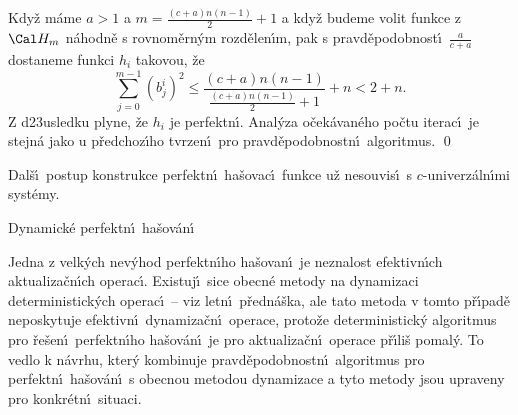 \documentclass[a4paper,12pt]{article}
\begin{document}
\flushpar Kdy\v z m\'ame $a>1$ a $m=\frac {(c+a)n(n-1)}2+1$ 
a kdy\v z budeme volit funkce z $\Cal H_m$ 
n\'ahodn\v e s rovnom\v ern\'ym rozd\v elen\'\i m, pak s pravd\v epodobnost\'\i\ 
$\frac a{c+a}$ do\-sta\-ne\-me funkci $h_i$ takovou, \v ze 
$$\sum_{j=0}^{m-1}(b^i_j)^2\le\frac {(c+a)n(n-1)}{\frac {(c+a)n(n
-1)}2+1}+n<2+n.$$
Z d\accent23usledku plyne, \v ze $h_i$ je perfektn\'\i .  Anal\'yza 
o\v cek\'avan\'eho po\v ctu iterac\'\i\ je stejn\'a jako u p\v redchoz\'\i ho tvrzen\'\i\ 
pro pravd\v epodobnostn\'\i\ algoritmus.  \qed
\enddemo

\flushpar Dal\v s\'\i\ postup konstrukce perfektn\'\i\ ha\v sovac\'\i\ funkce u\v z 
nesouvis\'\i\ s $c$-univerz\'aln\'\i mi syst\'emy. 

\subhead
Dynamick\'e perfektn\'\i\ ha\v sov\'an\'\i
\endsubhead
\smallskip

\flushpar Jedna z velk\'ych nev\'yhod perfektn\'\i ho ha\v sovan\'\i\ je 
neznalost efektivn\'\i ch aktualiza\v cn\'\i ch ope\-rac\'\i . Existuj\'\i\ sice 
obecn\'e meto\-dy na dynamizaci deterministick\'ych operac\'\i\ -- viz 
letn\'\i\ p\v redn\'a\v s\-ka, ale tato metoda v tomto p\v r\'\i pad\v e neposkytuje 
efektivn\'\i\ dynamiza\v cn\'\i\ operace, proto\v ze deterministick\'y 
algoritmus pro \v re\-\v se\-n\'\i\ perfektn\'\i ho ha\v sov\'an\'\i\ je pro 
aktualiza\v cn\'\i\ ope\-race p\v r\'\i li\v s pomal\'y. To vedlo k n\'avrhu, 
kter\'y kombinuje pravd\v epodobnostn\'\i\ algoritmus pro perfektn\'\i\ 
ha\v sov\'an\'\i\ s obecnou metodou dynami\-za\-ce a tyto metody jsou 
upraveny pro konkr\'etn\'\i\ situaci. 
\medskip
\end{document}
